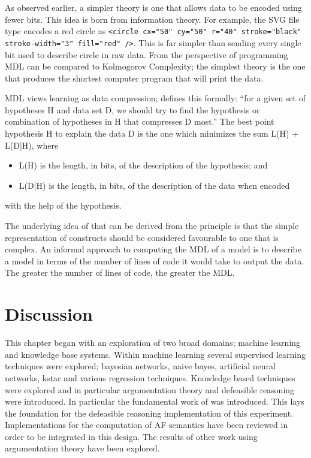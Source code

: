 As observed earlier, a simpler theory is one that allows data to be encoded using fewer bits. This idea is born from information theory. For example, the SVG file type encodes a red circle as \lstinline{<circle cx="50" cy="50" r="40" stroke="black" stroke-width="3" fill="red" />}. This is far simpler than sending every single bit used to describe circle in raw data. From the perspective of programming MDL can be compared to Kolmogorov Complexity; the simplest theory is the one that produces the shortest computer program that will print the data.

MDL views learning as data compression; \cite{grunwald2005tutorial} defines this formally: ``for a given set of hypotheses H and data set D, we should try to find the hypothesis or combination of hypotheses in H that compresses D most.'' The best point hypothesis H to explain the data D is the one which minimizes the sum L(H) + L(D|H), where
\begin{itemize}
  \item L(H) is the length, in bits, of the description of the hypothesis; and
  \item L(D|H) is the length, in bits, of the description of the data when encoded
\end{itemize}
with the help of the hypothesis.

The underlying idea of that can be derived from the principle is that the simple representation of constructs should be considered favourable to one that is complex. An informal approach to computing the MDL of a model is to describe a model in terms of the number of lines of code it would take to output the data. The greater the number of lines of code, the greater the MDL.

\section{Discussion}

This chapter began with an exploration of two broad domains; machine learning and knowledge base systems. Within machine learning several supervised learning techniques were explored; bayesian networks, naive bayes, artificial neural networks, kstar and various regression techniques. Knowledge based techniques were explored and in particular argumentation theory and defeasible reasoning were introduced. In particular the fundamental work of \cite{dung1995acceptability} was introduced. This lays the foundation for the defeasible reasoning implementation of this experiment. Implementations for the computation of AF semantics have been reviewed in order to be integrated in this design. The results of other work using argumentation theory have been explored. 

